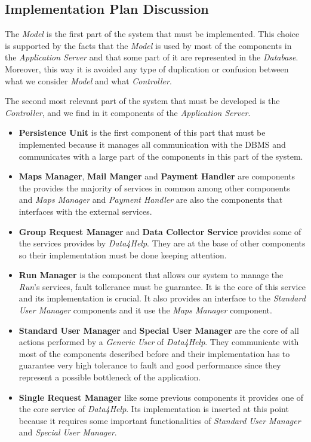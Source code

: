 \subsection{Implementation Plan Discussion}
\myparagraph{}
The \textit{Model} is the first part of the system that must be implemented. This choice is supported by the facts that the \textit{Model} is used by most of the components in the \textit{Application Server} and that some part of it are represented in the \textit{Database}. Moreover, this way it is avoided any type of duplication or confusion between what we consider \textit{Model} and what \textit{Controller}.

\myparagraph{}
The second most relevant part of the system that must be developed is the \textit{Controller}, and we find in it components of the \textit{Application Server}.
\begin{itemize}
  \item \textbf{Persistence Unit} is the first component of this part that must be implemented because it manages all communication with the DBMS and communicates with a large part of the components in this part of the system.
  \item \textbf{Maps Manager}, \textbf{Mail Manger} and \textbf{Payment Handler} are components the provides the majority of services in common among other components and \textit{Maps Manager} and \textit{Payment Handler} are also the components that interfaces with the external services.
  \item \textbf{Group Request Manager} and \textbf{Data Collector Service} provides some of the services provides by \textit{Data4Help}. They are at the base of other components so their implementation must be done keeping attention.
  \item \textbf{Run Manager} is the component that allows our system to manage the \textit{Run}'s services, fault tollerance must be guarantee. It is the core of this service and its implementation is crucial. It also provides an interface to the \textit{Standard User Manager} components and it use the \textit{Maps Manager} component.
  \item \textbf{Standard User Manager} and \textbf{Special User Manager} are the core of all actions performed by a \textit{Generic User} of \textit{Data4Help}. They communicate with most of the components described before and their implementation has to guarantee very high tolerance to fault and good performance since they represent a possible bottleneck of the application.
  \item \textbf{Single Request Manager} like some previous components it provides one of the core service of \textit{Data4Help}. Its implementation is inserted at this point because it requires some important functionalities of \textit{Standard User Manager} and \textit{Special User Manager}.
\end{itemize}

